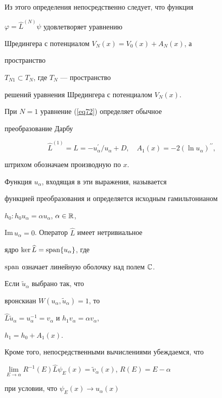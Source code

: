 Из этого определения непосредственно следует, что функция


$\varphi =\widehat{L}^{(N)}\psi$  удовлетворяет уравнению


Шредингера с потенциалом $V_N(x)=V_0(x)+A_N (x)$, а


пространство


$T_{N1}\subset T_N$, где $T_N$ --- пространство


решений уравнения Шредингера с потенциалом $V_N(x)$.





При $N=1$ уравнение (\ref{eq72}) определяет обычное


преобразование Дарбу \cite{viii}


$$


\widehat{L}^{(1)}=\widehat{L}=-u_\alpha ^{\prime }/u_\alpha


+D,\quad A_1(x)=-2(\ln u_\alpha )^{\prime \prime },


$$


штрихом обозначаем производную по $x$.


Функция $u_\alpha $, входящая в эти выражения, называется


функцией преобразования и определяется исходным гамильтонианом


$h_0: h_0u_\alpha =\alpha u_\alpha$, $\alpha \in {\Bbb R}$,


Im\,$u_\alpha =0$. Оператор $\widehat{L}$ имеет нетривиальное


ядро $\ker \widehat L=\operatorname{span}\{ u_\alpha\}$, где


$\operatorname{span}$ означает линейную оболочку над полем ${\Bbb C}$.





Если $\widetilde u_\alpha $ выбрано так, что


вронскиан $W(u_\alpha  ,\widetilde u_\alpha )=1$, то


$\widehat{L}\widetilde{u}_\alpha =u_\alpha ^{-


1}=v_\alpha $ и $h_1v_\alpha =\alpha v_\alpha$,


$h_1=h_0+A_1(x)$.


Кроме того, непосредственными вычислениями убеждаемся, что


$\lim\limits_{E\rightarrow \alpha }R^{-1}(E)\widehat{L}


\psi_E(x)=\widetilde{v}_\alpha (x)$, $R(E)=E-\alpha$


при условии, что $\psi _E(x){\rightarrow }u_\alpha (x)$


